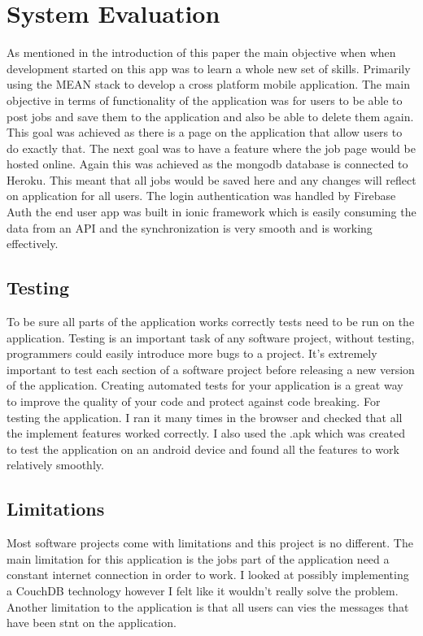 \chapter{System Evaluation}
As mentioned in the introduction of this paper the main objective when when development started on this app was to learn a whole new set of skills. Primarily using the MEAN stack to develop a cross platform mobile application. The main objective in terms of functionality of the application was for users to be able to post jobs and save them to the application and also be able to delete them again. This goal was achieved as there is a page on the application that allow users to do exactly that. The next goal was to have a feature where the job page would be hosted online. Again this was achieved  as the mongodb database is connected to Heroku. This meant that all jobs would be saved here and any changes will reflect on application for all users. The login authentication was handled by Firebase Auth the end user app was built in ionic framework which is easily consuming the data from an API and the synchronization is very smooth and is working effectively. 
\section{Testing}
To be sure all parts of the application works correctly tests need to be run on the application. Testing is an important task of any software project, without testing, programmers could easily introduce more bugs to a project. It's extremely important to test each section of a software project before releasing a new version of the application. Creating automated tests for your application is a great way to improve the quality of your code and protect against code breaking.
For testing the application. I ran it many times in the browser and checked that all the implement features worked correctly. I also used the .apk which was created to test the application on an android device and found all the features to work relatively smoothly.

\section{Limitations}
Most software projects come with limitations and this project is no different. The main limitation for this application is the jobs part of the application need a constant internet connection in order to work. I looked at possibly implementing a CouchDB technology however I felt like it wouldn't really solve the problem. Another limitation to the application is that all users can vies the messages that have been stnt on the application.

